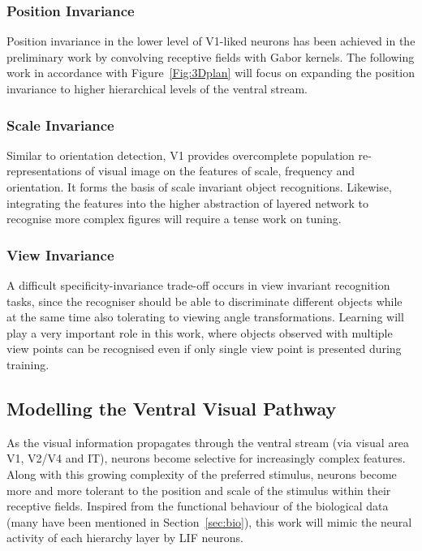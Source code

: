 \subsubsection{Position Invariance}
Position invariance in the lower level of V1-liked neurons has been achieved in the preliminary work by convolving receptive fields with Gabor kernels.
The following work in accordance with Figure~\ref{Fig:3Dplan} will focus on expanding the position invariance to higher hierarchical levels of the ventral stream.
\subsubsection{Scale Invariance}
Similar to orientation detection, V1 provides overcomplete population re-representations of visual image on the features of scale, frequency and orientation.
It forms the basis of scale invariant object recognitions.
Likewise, integrating the features into the higher abstraction of layered network to recognise more complex figures will require a tense work on tuning.
\subsubsection{View Invariance}
A difficult specificity-invariance trade-off occurs in view invariant recognition tasks, since the recogniser should be able to discriminate different objects while at the same time also tolerating to viewing angle transformations.
Learning will play a very important role in this work, where objects observed with multiple view points can be recognised even if only single view point is presented during training.
\subsection{Modelling the Ventral Visual Pathway}
As the visual information propagates through the ventral stream (via visual area V1, V2/V4 and IT), neurons become selective for increasingly complex features. 
Along with this growing complexity of the preferred stimulus, neurons become more and more tolerant to the position and scale of the stimulus within their receptive fields.
Inspired from the functional behaviour of the biological data (many have been mentioned in Section~\ref{sec:bio}), this work will mimic the neural activity of each hierarchy layer by LIF neurons.
 
